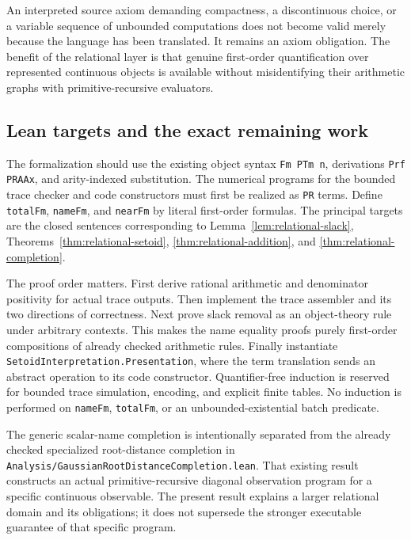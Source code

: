 An interpreted source axiom demanding compactness, a discontinuous choice,
or a variable sequence of unbounded computations does not become valid
merely because the language has been translated. It remains an axiom
obligation. The benefit of the relational layer is that genuine first-order
quantification over represented continuous objects is available without
misidentifying their arithmetic graphs with primitive-recursive evaluators.

\subsection{Lean targets and the exact remaining work}

The formalization should use the existing object syntax
\texttt{Fm PTm n}, derivations \texttt{Prf PRAAx}, and arity-indexed
substitution. The numerical programs for the bounded trace checker and
code constructors must first be realized as \texttt{PR} terms. Define
\texttt{totalFm}, \texttt{nameFm}, and \texttt{nearFm} by literal
first-order formulas. The principal targets are the closed sentences
corresponding to Lemma~\ref{lem:relational-slack},
Theorems~\ref{thm:relational-setoid}, \ref{thm:relational-addition}, and
\ref{thm:relational-completion}.

The proof order matters. First derive rational arithmetic and denominator
positivity for actual trace outputs. Then implement the trace assembler and
its two directions of correctness. Next prove slack removal as an
object-theory rule under arbitrary contexts. This makes the name equality
proofs purely first-order compositions of already checked arithmetic rules.
Finally instantiate \texttt{SetoidInterpretation.Presentation}, where the
term translation sends an abstract operation to its code constructor.
Quantifier-free induction is reserved for bounded trace simulation,
encoding, and explicit finite tables. No induction is performed on
\texttt{nameFm}, \texttt{totalFm}, or an unbounded-existential batch predicate.

The generic scalar-name completion is intentionally separated from the
already checked specialized root-distance completion in
\texttt{Analysis/GaussianRootDistanceCompletion.lean}. That existing result
constructs an actual primitive-recursive diagonal observation program for a
specific continuous observable. The present result explains a larger
relational domain and its obligations; it does not supersede the stronger
executable guarantee of that specific program.
